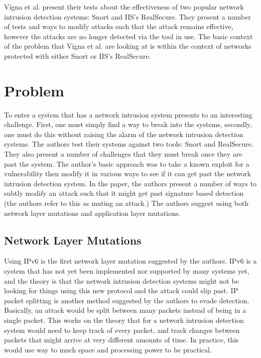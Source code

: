 \documentclass{reading_glasses}
\begin{document}
Vigna et al. present their tests about the effectiveness of two popular network intrusion detection systems: Snort and IIS's RealSecure.  They present a number of tests and ways to modify attacks such that the attack remains effective, however the attacks are no longer detected via the tool in use.  
The basic context of the problem that Vigna et al. are looking at is within the context of networks protected with either Snort or IIS's RealSecure. \cite{vigna2004testing}

\section{Problem}
To enter a system that has a network intrusion system presents to an interesting challenge.  First, one must simply find a way to break into the systems, secondly, one must do this without raising the alarm of the network intrusion detection systems.  The authors test their systems against two tools: Snort and RealSecure.  They also present a number of challenges that they must break once they are past the system.  The author's basic approach was to take a known exploit for a vulnerability then modify it in various ways to see if it can get past the network intrusion detection system.  In the paper, the authors present a number of ways to subtly modify an attack such that it might get past signature based detection (the authors refer to this as muting an attack.)  The authors suggest using both network layer mutations and application layer mutations. \cite{vigna2004testing}

\subsection{Network Layer Mutations}
Using IPv6 is the first network layer mutation suggested by the authors.  IPv6 is a system that has not yet been implemented nor supported by many systems yet, and the theory is that the network intrusion detection systems might not be looking for things using this new protocol and the attack could slip past.  IP packet splitting is another method suggested by the authors to evade detection.  Basically, an attack would be split between many packets instead of being in a single packet.  This works on the theory that for a network intrusion detection system would need to keep track of every packet, and track changes between packets that might arrive at very different amounts of time.  In practice, this would use way to much space and processing power to be practical. \cite{vigna2004testing}
\end{document}
